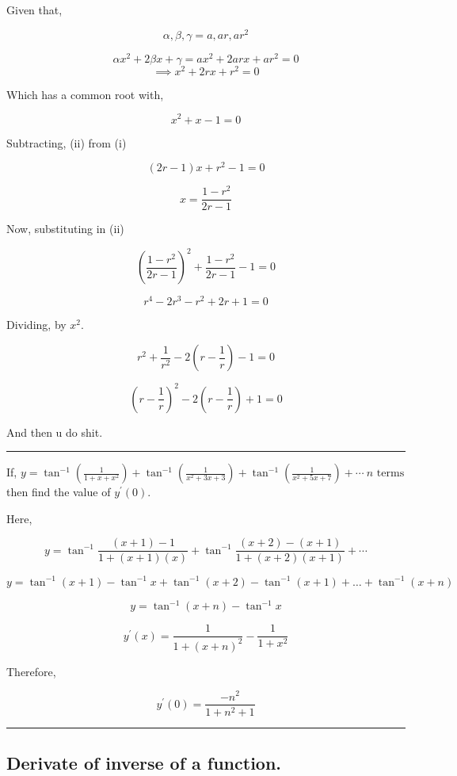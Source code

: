 \documentclass[twocolumn]{article}
\begin{document}
Given that, 

\[
    \alpha , \beta, \gamma = a, ar, ar^{2} 
\]

\[
    \alpha x^{2} + 2\beta x + \gamma = ax^{2} + 2arx + ar^{2} = 0
\]
\[
    \implies x^{2} + 2rx + r^{2} = 0 \tag{i}
\]

Which has a common root with, 

\[
    x^{2} + x - 1 = 0 \tag{ii}
\]

Subtracting, (ii) from (i)

\[
    (2r - 1)x + r^{2} - 1 = 0
\]

\[
    x = \frac{1-r^{2}}{2r-1}
\]

Now, substituting in (ii)

\[
    (\frac{1-r^{2}}{2r-1})^{2} + \frac{1-r^{2}}{2r-1} - 1 = 0
\]

\[
    r ^{4} - 2r ^{3} - r^{2} + 2r + 1 = 0
\]

Dividing, by \(x^{2}\).  

\[
    r^{2} + \frac{1}{r^{2}} - 2(r - \frac{1}{r}) - 1 = 0
\]

\[
    (r - \frac{1}{r})^{2} - 2(r - \frac{1}{r}) + 1 = 0
\]

And then u do shit. 

\vspace{0.1in}

\hrule 

\begin{question}
    If, \( \displaystyle y = \tan ^{-1} (\frac{1}{1+x+x^{2}}) + \tan ^{-1} (\frac{1}{x^{2} + 3x + 3}) + \tan ^{-1} (\frac{1}{x^{2} +5x + 7 }) + \cdots\ n\text{ terms} \) then find the value of \(y^{\prime} (0)\).   
\end{question}

Here, 

\[
    y = \tan ^{-1} \frac{(x+1)-1}{1 + (x+1)(x)} + \tan ^{-1} \frac{(x+2)-(x+1)}{1 + (x+2)(x+1)} + \cdots 
\]

\[
    y = \tan ^{-1} (x+1) - \tan ^{-1} x + \tan ^{-1} (x+2) - \tan ^{-1}(x+1) + \dots + \tan^{-1} (x+n) 
\]

\[
    y = \tan^{-1} (x+n) - \tan ^{-1} x
\]

\[
    y^{\prime} (x) = \frac{1}{1 + (x+n)^{2}} - \frac{1}{1+x^{2} }
\]

Therefore, 

\[
    \boxed{y^{\prime} (0) = \frac{-n^{2}}{1 + n^{2} + 1}}
\]

\hrule

\subsection*{Derivate of inverse of a function.}
\end{document}
